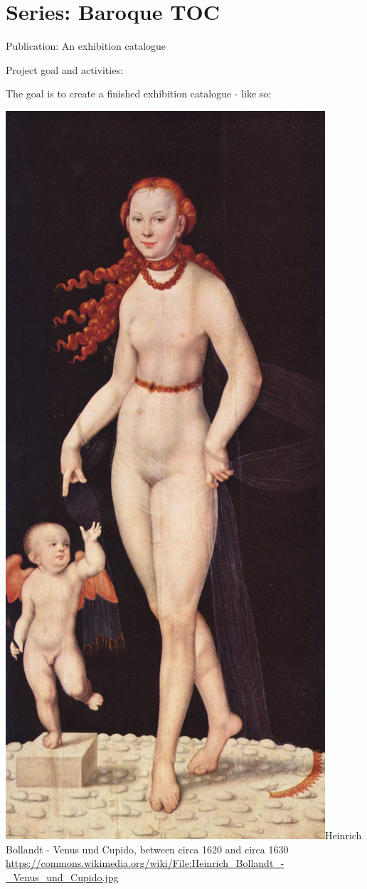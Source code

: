 \documentclass[
  letterpaper,
]{book}
\begin{document}
\hypertarget{series-baroque-toc}{%
\section{Series: Baroque TOC}\label{series-baroque-toc}}

Publication: An exhibition catalogue

Project goal and activities:

The goal is to create a finished exhibition catalogue - like so:

\includegraphics{./6780765/Heinrich_Bollandt_-_Venus_und_Cupido.jpg}Heinrich
Bollandt - Venus und Cupido, between circa 1620 and circa 1630
\url{https://commons.wikimedia.org/wiki/File:Heinrich_Bollandt_-_Venus_und_Cupido.jpg}
\end{document}
